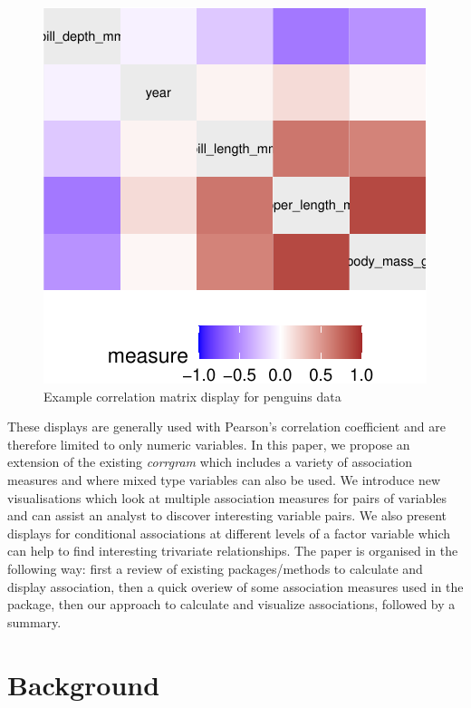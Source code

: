 \begin{Schunk}
\begin{figure}

{\centering \includegraphics{rj_paper_files/figure-latex/corrgram-1} 

}

\caption[Example correlation matrix display for penguins data]{Example correlation matrix display for penguins data}\label{fig:corrgram}
\end{figure}
\end{Schunk}

These displays are generally used with Pearson's correlation coefficient
and are therefore limited to only numeric variables. In this paper, we
propose an extension of the existing \emph{corrgram} which includes a
variety of association measures and where mixed type variables can also
be used. We introduce new visualisations which look at multiple
association measures for pairs of variables and can assist an analyst to
discover interesting variable pairs. We also present displays for
conditional associations at different levels of a factor variable which
can help to find interesting trivariate relationships. The paper is
organised in the following way: first a review of existing
packages/methods to calculate and display association, then a quick
overiew of some association measures used in the package, then our
approach to calculate and visualize associations, followed by a summary.

\hypertarget{background}{%
\section{Background}\label{background}}

